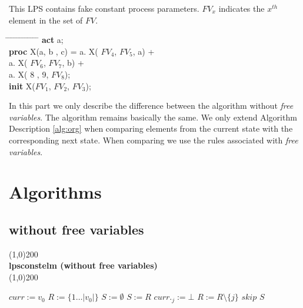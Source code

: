 \index{}\documentclass[a4paper,10pt]{article}
\theoremstyle{plain}
\theoremstyle{definition}
\newcommand{\pps}{process parameters}
\newcommand{\ti}{\textit}
\newcommand{\tb}{\textbf}
\newcommand{\tabw}{\hspace*{15.mm} \= \hspace*{20.mm} \= \hspace*{5.mm} \= \hspace*{5.mm} \= \hspace*{5.mm} \= \hspace*{5.mm}  \= \hspace*{5.mm}  \= \hspace*{5.mm}  \= \hspace*{5.mm} \= \hspace*{5.mm} \= \hspace*{5.mm}  \= \hspace*{5.mm}  \= \hspace*{5.mm}\kill}
\begin{document}
\begin{example}\label{freevarcheckup} This LPS contains fake constant \pps .  $FV_x$ indicates the $x^{th}$ element in the set of $FV$.
\begin{tabbing}
\tabw
\tb{act} \> a; \\
\tb{proc} \> X(a, b , c) =     \>  a. X( $FV_4$, $FV_5$, a) + \\
\>                             \>  a. X( $FV_6$, $FV_7$, b) + \\
\>                             \>  a. X(   8 ,   9,  $FV_8$);  \\
\tb{init} \> X($FV_1$, $FV_2$, $FV_3$);
\end{tabbing}
\end{example}


In this part we only describe the difference between the algorithm without \ti{free variables}. The algorithm remains basically the same. We only extend Algorithm Description \ref{alg:org} when comparing elements from the current state with the corresponding next state. When comparing we use the rules associated with \ti{free variables}.

\newpage
\section{Algorithms}
\subsection{without free variables} \label{sec:alg}
\line(1,0){200}\\
\textbf{lpsconstelm (without free variables)}\\
\line(1,0){200}
\begin{algorithmic}[1]
\STATE $curr := v_0$
\STATE $R := \lbrace 1 \ldots \vert v_0 \vert \rbrace $
\STATE $S := \emptyset $
    \STATE $S := R$
              \STATE $curr._j := \bot$
              \STATE $R := R \setminus \lbrace j \rbrace$
              \STATE $skip$
          \ENDIF
        \ENDFOR
    \ENDFOR
  \ENDWHILE
\RETURN $S$
\end{algorithmic}

\newpage
\end{document}
